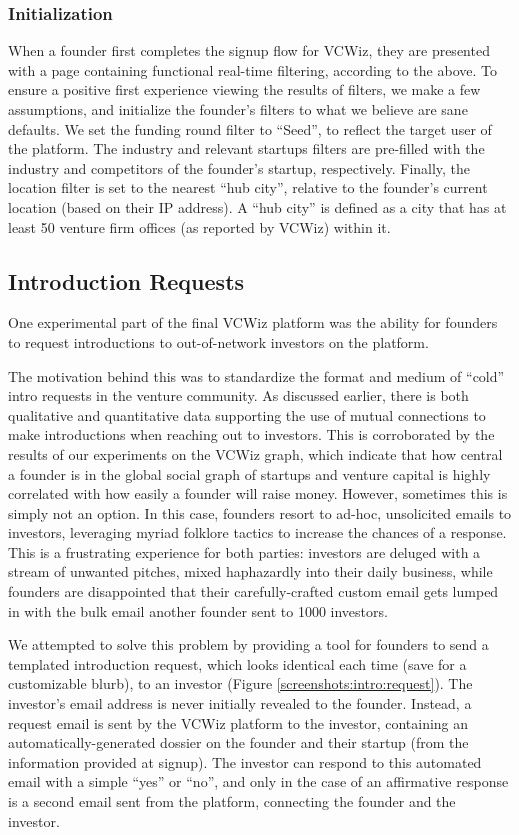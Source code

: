 \subsubsection{Initialization}

When a founder first completes the signup flow for VCWiz, they are presented with a page containing functional real-time filtering, according to the above. To ensure a positive first experience viewing the results of filters, we make a few assumptions, and initialize the founder's filters to what we believe are sane defaults. We set the funding round filter to ``Seed'', to reflect the target user of the platform. The industry and relevant startups filters are pre-filled with the industry and competitors of the founder's startup, respectively. Finally, the location filter is set to the nearest ``hub city'', relative to the founder's current location (based on their IP address). A ``hub city'' is defined as a city that has at least 50 venture firm offices (as reported by VCWiz) within it.

\subsection{Introduction Requests}
\label{chap4:introrequests}

One experimental part of the final VCWiz platform was the ability for founders to request introductions to out-of-network investors on the platform.

The motivation behind this was to standardize the format and medium of ``cold'' intro requests in the venture community. As discussed earlier, there is both qualitative and quantitative data supporting the use of mutual connections to make introductions when reaching out to investors. This is corroborated by the results of our experiments on the VCWiz graph, which indicate that how central a founder is in the global social graph of startups and venture capital is highly correlated with how easily a founder will raise money. However, sometimes this is simply not an option. In this case, founders resort to ad-hoc, unsolicited emails to investors, leveraging myriad folklore tactics to increase the chances of a response. This is a frustrating experience for both parties: investors are deluged with a stream of unwanted pitches, mixed haphazardly into their daily business, while founders are disappointed that their carefully-crafted custom email gets lumped in with the bulk email another founder sent to 1000 investors.

We attempted to solve this problem by providing a tool for founders to send a templated introduction request, which looks identical each time (save for a customizable blurb), to an investor (Figure \ref{screenshots:intro:request}). The investor's email address is never initially revealed to the founder. Instead, a request email is sent by the VCWiz platform to the investor, containing an automatically-generated dossier on the founder and their startup (from the information provided at signup). The investor can respond to this automated email with a simple ``yes'' or ``no'', and only in the case of an affirmative response is a second email sent from the platform, connecting the founder and the investor.

